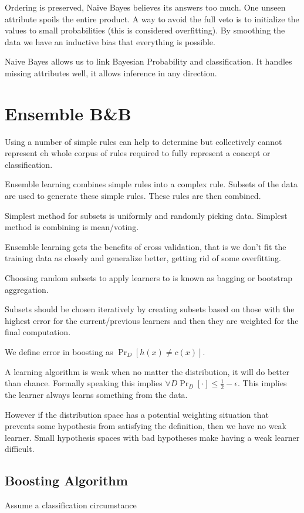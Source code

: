 \documentclass{article}
\begin{document}
Ordering is preserved, Naive Bayes believes its answers too much. One unseen
attribute spoils the entire product.  A way to avoid the full veto is to
initialize the values to small probabilities (this is considered overfitting). 
By smoothing the data we have an inductive bias that everything is possible. 

Naive Bayes allows us to link Bayesian Probability and classification. It 
handles missing attributes well, it allows inference in any direction. 

\section{Ensemble B\&B}
Using a number of simple rules can help to determine but collectively cannot 
represent eh whole corpus of rules required to fully represent a concept or
classification. 

Ensemble learning combines simple rules into a complex rule. Subsets of the data
are used to generate these simple rules. These rules are then combined. 

Simplest method for subsets is uniformly and randomly picking data. Simplest 
method is combining is mean/voting. 

Ensemble learning gets the benefits of cross validation, that is we don't fit
the training data as closely and generalize better, getting rid of some
overfitting. 

Choosing random subsets to apply learners to is known as bagging or bootstrap
aggregation. 

Subsets should be chosen iteratively by creating subsets based on those with the 
highest error for the current/previous learners and then they are weighted for
the final computation. 

We define error in boosting as $\Pr_D[h(x) \neq c(x)]$.

A learning algorithm is weak when no matter the distribution, it will do better
than chance. Formally speaking this implies $\forall D \Pr_D[\cdot] \leq 
\frac{1}{2} - \epsilon$. This implies the learner always learns something from 
the data. 

However if the distribution space has a potential weighting situation that 
prevents some hypothesis from satisfying the definition, then we have no weak
learner. Small hypothesis spaces with bad hypotheses make having a weak learner
difficult. 

\subsection{Boosting Algorithm}
Assume a classification circumstance
\end{document}
